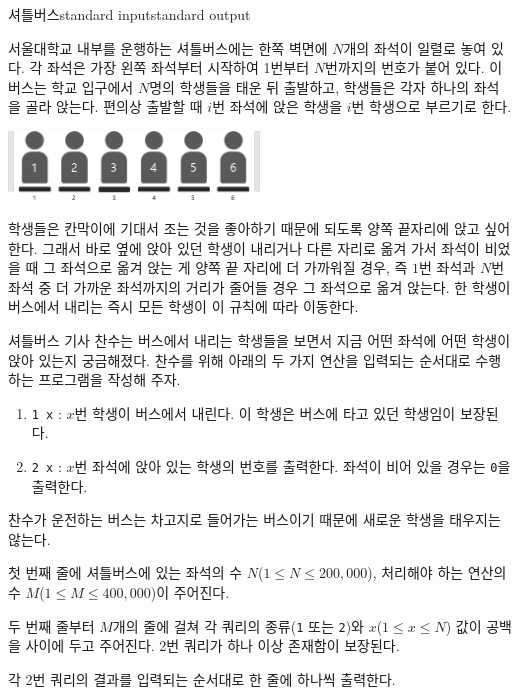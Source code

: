 \begin{problem}{셔틀버스}{standard input}{standard output}

서울대학교 내부를 운행하는 셔틀버스에는 한쪽 벽면에 $N$개의 좌석이 일렬로 놓여 있다. 각 좌석은 가장 왼쪽 좌석부터 시작하여 1번부터 $N$번까지의 번호가 붙어 있다. 이 버스는 학교 입구에서 $N$명의 학생들을 태운 뒤 출발하고, 학생들은 각자 하나의 좌석을 골라 앉는다. 편의상 출발할 때 $i$번 좌석에 앉은 학생을 $i$번 학생으로 부르기로 한다.

\begin{center}
  \includegraphics[width=0.5\textwidth]{bus1.png}
\end{center}
학생들은 칸막이에 기대서 조는 것을 좋아하기 때문에 되도록 양쪽 끝자리에 앉고 싶어 한다. 그래서 바로 옆에 앉아 있던 학생이 내리거나 다른 자리로 옮겨 가서 좌석이 비었을 때 그 좌석으로 옮겨 앉는 게 양쪽 끝 자리에 더 가까워질 경우, 즉 $1$번 좌석과 $N$번 좌석 중 더 가까운 좌석까지의 거리가 줄어들 경우 그 좌석으로 옮겨 앉는다. 한 학생이 버스에서 내리는 즉시 모든 학생이 이 규칙에 따라 이동한다.

셔틀버스 기사 찬수는 버스에서 내리는 학생들을 보면서 지금 어떤 좌석에 어떤 학생이 앉아 있는지 궁금해졌다. 찬수를 위해 아래의 두 가지 연산을 입력되는 순서대로 수행하는 프로그램을 작성해 주자.

\begin{enumerate}
\item{\texttt{1 x} : $x$번 학생이 버스에서 내린다. 이 학생은 버스에 타고 있던 학생임이 보장된다.}
\item{\texttt{2 x} : $x$번 좌석에 앉아 있는 학생의 번호를 출력한다. 좌석이 비어 있을 경우는 \texttt{0}을 출력한다.}
\end{enumerate}

찬수가 운전하는 버스는 차고지로 들어가는 버스이기 때문에 새로운 학생을 태우지는 않는다.

\InputFile
첫 번째 줄에 셔틀버스에 있는 좌석의 수 $N$($1 \le N \le 200,000$), 처리해야 하는 연산의 수 $M$($1 \le M \le 400,000$)이 주어진다.

두 번째 줄부터 $M$개의 줄에 걸쳐 각 쿼리의 종류(\texttt{1} 또는 \texttt{2})와 $x$($1 \le x \le N$) 값이 공백을 사이에 두고 주어진다. 2번 쿼리가 하나 이상 존재함이 보장된다.

\OutputFile
각 2번 쿼리의 결과를 입력되는 순서대로 한 줄에 하나씩 출력한다.


\end{problem}
